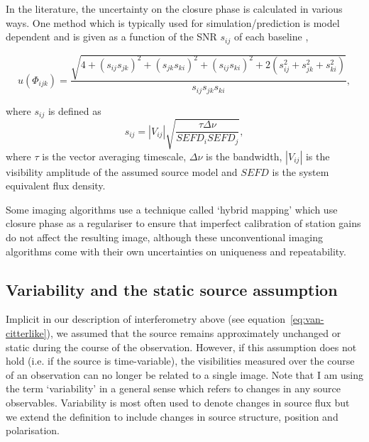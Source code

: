 In the literature, the uncertainty on the closure phase is calculated in various ways. One method which is typically used for simulation/prediction is model dependent  and is given as a function of the SNR $s_{ij}$ of each baseline \citep{Rogers_1995},

\begin{equation}\label{eq:ucp}
u(\Phi_{ijk}) = \frac{\sqrt{4 + (s_{ij}s_{jk})^2 + (s_{jk}s_{ki})^2 + (s_{ij}s_{ki})^2 +
                        2(s_{ij}^2+s_{jk}^2+s_{ki}^2)}}{s_{ij}s_{jk}s_{ki}},
\end{equation}

\noindent where $s_{ij}$ is defined as
\begin{equation}
s_{ij}=|V_{ij}| \sqrt{\frac{ \tau \Delta \nu}{SEFD_i SEFD_j}},
\end{equation}
where $\tau$ is the vector averaging timescale, $\Delta \nu$ is the bandwidth, $|V_{ij}|$ is the visibility amplitude of the assumed source model and $SEFD$ is the system equivalent flux density.


Some imaging algorithms use a technique called `hybrid mapping' \citep[e.g.][]{Skilling_1984,Bouman_2015,Chael_2016} which use closure phase as a regulariser to ensure that imperfect calibration of station gains do not affect the resulting image, although these unconventional imaging algorithms come with their own uncertainties on uniqueness and repeatability. 

\subsection{Variability and the static source assumption}\label{sec:variability}
Implicit in our description of interferometry above (see equation~\ref{eq:van-citterlike}), we assumed that the source remains approximately unchanged or static during the course of the observation. However, if this assumption does not hold (i.e. if the source is time-variable), the visibilities measured over the course of an observation can no longer be related to a single image. 
Note that I am using the term `variability' in a general sense which refers to changes in any source observables. Variability is most often used to denote changes in source flux but we extend the definition to include changes in source structure, position and polarisation.


